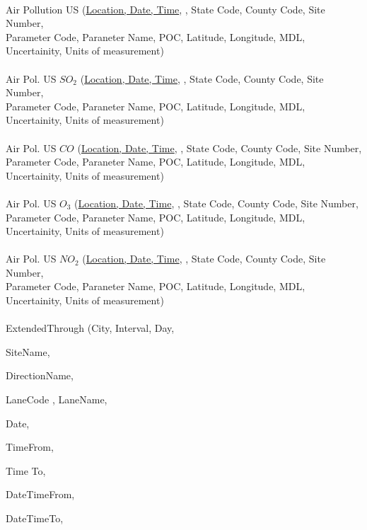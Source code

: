 \documentclass{article}
\begin{document}
\begin{center}
\begin{tabbing}
    \\
    Air Pollution US \> (\uline{Location, Date, Time}, , State Code, County Code, Site Number,\\ \> Parameter Code, Paraneter Name, POC, Latitude, Longitude, MDL,\\ \> Uncertainity, Units of measurement)\\\\
    Air Pol. US $SO_{2}$  \> (\uline{Location, Date, Time}, , State Code, County Code, Site Number,\\ \> Parameter Code, Paraneter Name, POC, Latitude, Longitude, MDL,\\ \> Uncertainity, Units of measurement)\\\\
    Air Pol. US $CO$  \> (\uline{Location, Date, Time}, , State Code, County Code, Site Number,\\ \> Parameter Code, Paraneter Name, POC, Latitude, Longitude, MDL,\\ \> Uncertainity, Units of measurement)\\\\
    Air Pol. US $O_3$  \> (\uline{Location, Date, Time}, , State Code, County Code, Site Number,\\ \> Parameter Code, Paraneter Name, POC, Latitude, Longitude, MDL,\\ \> Uncertainity, Units of measurement)\\\\
    Air Pol. US $NO_2$  \> (\uline{Location, Date, Time}, , State Code, County Code, Site Number,\\ \> Parameter Code, Paraneter Name, POC, Latitude, Longitude, MDL,\\ \> Uncertainity, Units of measurement)\\\\
    
    
    ExtendedThrough \> (City, Interval, Day,

SiteName,

DirectionName,

LaneCode
,
LaneName,
\\ \>

Date,

TimeFrom,

Time To,

DateTimeFrom,

DateTimeTo,


\end{tabbing}
\end{center}
\end{document}
